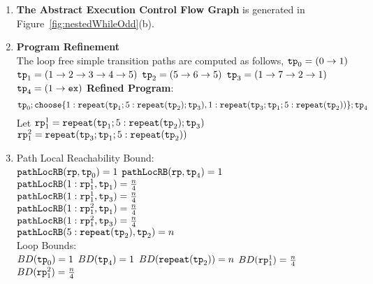   \begin{enumerate}
    \item  \textbf{The Abstract Execution Control Flow Graph} is generated in Figure~\ref{fig:nestedWhileOdd}(b).
    \item \textbf{Program Refinement}
    \\
    The loop free simple transition paths are computed as follows,
       $\mathtt{tp}_0 = (0 \to 1)$
      \quad
      $\mathtt{tp}_1 = (1 \to 2 \to 3 \to 4 \to 5)$
      \quad
      $\mathtt{tp}_2 = (5 \to 6 \to 5)$
      \quad
      $\mathtt{tp}_3 = (1 \to 7 \to 2 \to 1)$
      \quad
      $\mathtt{tp}_4 = (1 \to \mathtt{ex})$
  \textbf{Refined Program}:
  \[
    \tpath_0 ; \rpchoose{1: \rprepeat(\tpath_1; 5:\rprepeat(\tpath_2); \tpath_3) , 
    1: \rprepeat(\tpath_3; \tpath_1; 5:\rprepeat(\tpath_2))}; \tpath_4
    \]
    Let $\mathtt{rp}_1^1 = \mathtt{repeat}(\mathtt{tp}_1; 5:\mathtt{repeat}(\mathtt{tp}_2); \mathtt{tp}_3)$
    \\
    $\mathtt{rp}_1^2 = \mathtt{repeat}(\mathtt{tp}_3; \mathtt{tp}_1; 5:\mathtt{repeat}(\mathtt{tp}_2))$
    \item {Path Local Reachability Bound}:
    \\
    $\mathtt{pathLocRB}(\mathtt{rp}, \mathtt{tp}_0) = 1$ \quad
    $\mathtt{pathLocRB}(\mathtt{rp}, \mathtt{tp}_4) = 1$ \\
    $\mathtt{pathLocRB}(1: \mathtt{rp}_1^1, \mathtt{tp}_1) = \frac{n}{4}$ \\
    $\mathtt{pathLocRB}(1: \mathtt{rp}_1^1, \mathtt{tp}_3) = \frac{n}{4}$ \\
    $\mathtt{pathLocRB}(1: \mathtt{rp}_1^2, \mathtt{tp}_1) = \frac{n}{4}$ \\
    $\mathtt{pathLocRB}(1: \mathtt{rp}_1^2, \mathtt{tp}_3) = \frac{n}{4}$ \\
    $\mathtt{pathLocRB}(5: \mathtt{repeat}(\mathtt{tp}_2), \mathtt{tp}_2) = n$ 
    \\
    Loop Bounds:
    \\
    $BD(\mathtt{tp}_0) = 1$
    \quad
    $BD(\mathtt{tp}_4) = 1$
    \quad
    $BD(\mathtt{repeat}(\mathtt{tp}_2)) = n $
    \quad
    $BD(\mathtt{rp}_1^1) = \frac{n}{4} $
    \quad
    $BD(\mathtt{rp}_1^2) = \frac{n}{4} $


\end{enumerate}
